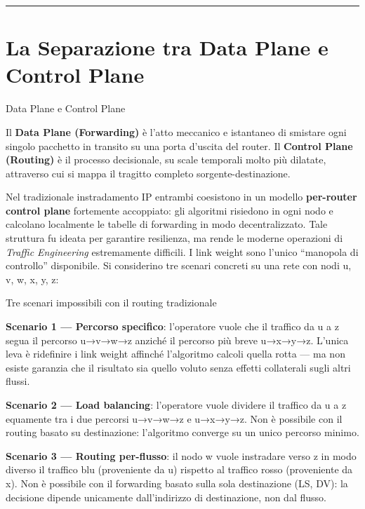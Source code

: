 \documentclass[
  italian,
  openany]{book}
\begin{document}
\begin{center}\rule{0.5\linewidth}{0.5pt}\end{center}

\section{La Separazione tra Data Plane e Control
Plane}\label{la-separazione-tra-data-plane-e-control-plane}

\begin{calloutdefinition}{Data Plane e Control Plane}

Il \textbf{Data Plane (Forwarding)} è l'atto meccanico e istantaneo di
smistare ogni singolo pacchetto in transito su una porta d'uscita del
router. Il \textbf{Control Plane (Routing)} è il processo decisionale,
su scale temporali molto più dilatate, attraverso cui si mappa il
tragitto completo sorgente-destinazione.

\end{calloutdefinition}

Nel tradizionale instradamento IP entrambi coesistono in un modello
\textbf{per-router control plane} fortemente accoppiato: gli algoritmi
risiedono in ogni nodo e calcolano localmente le tabelle di forwarding
in modo decentralizzato. Tale struttura fu ideata per garantire
resilienza, ma rende le moderne operazioni di \emph{Traffic Engineering}
estremamente difficili. I link weight sono l'unico ``manopola di
controllo'' disponibile. Si considerino tre scenari concreti su una rete
con nodi u, v, w, x, y, z:

\begin{callouttip}{Tre scenari impossibili con il routing tradizionale}

\textbf{Scenario 1 --- Percorso specifico}: l'operatore vuole che il
traffico da u a z segua il percorso u→v→w→z anziché il percorso più
breve u→x→y→z. L'unica leva è ridefinire i link weight affinché
l'algoritmo calcoli quella rotta --- ma non esiste garanzia che il
risultato sia quello voluto senza effetti collaterali sugli altri
flussi.

\textbf{Scenario 2 --- Load balancing}: l'operatore vuole dividere il
traffico da u a z equamente tra i due percorsi u→v→w→z e u→x→y→z. Non è
possibile con il routing basato su destinazione: l'algoritmo converge su
un unico percorso minimo.

\textbf{Scenario 3 --- Routing per-flusso}: il nodo w vuole instradare
verso z in modo diverso il traffico blu (proveniente da u) rispetto al
traffico rosso (proveniente da x). Non è possibile con il forwarding
basato sulla sola destinazione (LS, DV): la decisione dipende unicamente
dall'indirizzo di destinazione, non dal flusso.

\end{callouttip}
\end{document}
